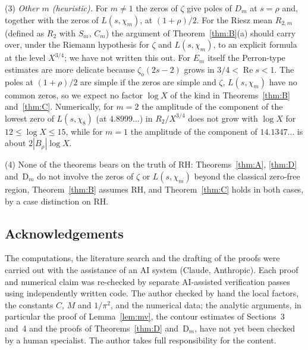\documentclass[11pt]{amsart}
\theoremstyle{remark}
\newcommand{\zo}{\zeta_{o}}
\begin{document}
(3) \emph{Other $m$ (heuristic).} For $m\ne1$ the zeros of $\zeta$ give poles of $D_m$ at $s=\rho$ and, together with the zeros of $L(s,\chi_m)$, at $(1+\rho)/2$. For the Riesz mean $R_{2,m}$ (defined as $R_2$ with $S_m$, $C_m$) the argument of Theorem~\ref{thm:B}(a) should carry over, under the Riemann hypothesis for $\zeta$ and $L(s,\chi_m)$, to an explicit formula at the level $X^{3/4}$; we have not written this out. For $E_m$ itself the Perron-type estimates are more delicate because $\zo(2s-2)$ grows in $3/4<\operatorname{Re}s<1$. The poles at $(1+\rho)/2$ are simple if the zeros are simple and $\zeta$, $L(s,\chi_m)$ have no common zeros, so we expect no factor $\log X$ of the kind in Theorems~\ref{thm:B} and~\ref{thm:C}. Numerically, for $m=2$ the amplitude of the component of the lowest zero of $L(s,\chi_8)$ (at $4.8999\ldots$) in $R_2/X^{3/4}$ does not grow with $\log X$ for $12\le\log X\le15$, while for $m=1$ the amplitude of the component of $14.1347\ldots$ is about $2|B_\rho|\log X$.

(4) None of the theorems bears on the truth of RH: Theorems~\ref{thm:A}, \ref{thm:D} and~D$_m$ do not involve the zeros of $\zeta$ or $L(s,\chi_m)$ beyond the classical zero-free region, Theorem~\ref{thm:B} assumes RH, and Theorem~\ref{thm:C} holds in both cases, by a case distinction on RH.

\subsection*{Acknowledgements}
The computations, the literature search and the drafting of the proofs were carried out with the assistance of an AI system (Claude, Anthropic). Each proof and numerical claim was re-checked by separate AI-assisted verification passes using independently written code. The author checked by hand the local factors, the constants $C$, $M$ and $1/\pi^2$, and the numerical data; the analytic arguments, in particular the proof of Lemma~\ref{lem:mv}, the contour estimates of Sections~3 and~4 and the proofs of Theorems~\ref{thm:D} and~D$_m$, have not yet been checked by a human specialist. The author takes full responsibility for the content.
\end{document}
